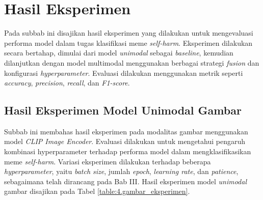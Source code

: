 \section{Hasil Eksperimen} \label{IV.Eksperimen}
Pada subbab ini disajikan hasil eksperimen yang dilakukan untuk mengevaluasi performa model dalam tugas klasifikasi meme \textit{self-harm}. Eksperimen dilakukan secara bertahap, dimulai dari model \textit{unimodal} sebagai \textit{baseline}, kemudian dilanjutkan dengan model multimodal menggunakan berbagai strategi \textit{fusion} dan konfigurasi \textit{hyperparameter}. Evaluasi dilakukan menggunakan metrik seperti \textit{accuracy}, \textit{precision}, \textit{recall}, dan \textit{F1-score}.


\subsection{Hasil Eksperimen Model Unimodal Gambar}
\label{IV.Eksperimen.Gambar}

Subbab ini membahas hasil eksperimen pada modalitas gambar menggunakan model \textit{CLIP Image Encoder}. Evaluasi dilakukan untuk mengetahui pengaruh kombinasi hyperparameter terhadap performa model dalam mengklasifikasikan meme \textit{self-harm}.
Variasi eksperimen dilakukan terhadap beberapa \textit{hyperparameter}, yaitu \textit{batch size}, jumlah \textit{epoch}, \textit{learning rate}, dan \textit{patience}, sebagaimana telah dirancang pada Bab III. Hasil eksperimen model \textit{unimodal} gambar disajikan pada Tabel \ref{table:4.gambar_eksperimen}.

